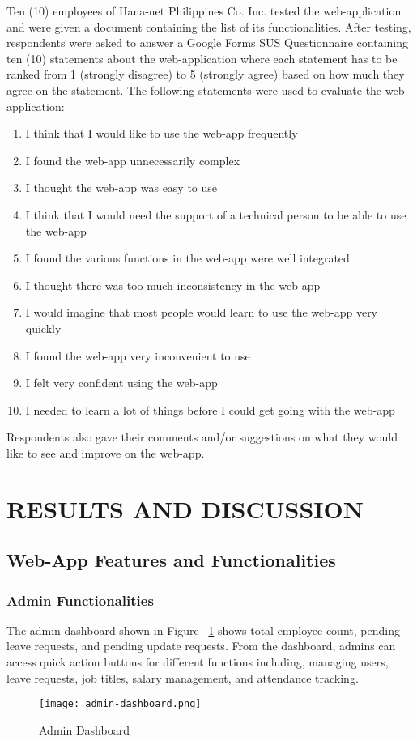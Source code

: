 \documentclass{icsthesis}
\begin{document}
\begin{mainmatter}
Ten (10) employees of Hana-net Philippines Co. Inc. tested the web-application and were given a document containing the list of its functionalities. After testing, respondents were asked to answer a Google Forms SUS Questionnaire containing ten (10) statements about the web-application where each statement has to be ranked from 1 (strongly disagree) to 5 (strongly agree) based on how much they agree on the statement. The following statements were used to evaluate the web-application:
    \begin{enumerate}
        \item I think that I would like to use the web-app frequently
        \item I found the web-app unnecessarily complex
        \item I thought the web-app was easy to use
        \item I think that I would need the support of a technical person to be able to use the web-app
        \item I found the various functions in the web-app were well integrated
        \item I thought there was too much inconsistency in the web-app
        \item I would imagine that most people would learn to use the web-app very quickly
        \item I found the web-app very inconvenient to use
        \item I felt very confident using the web-app
        \item I needed to learn a lot of things before I could get going with the web-app
    \end{enumerate}
Respondents also gave their comments and/or suggestions on what they would like to see and improve on the web-app.
		
		\section{RESULTS AND DISCUSSION}
			\subsection{\textbf{Web-App Features and Functionalities}}
\subsubsection{Admin Functionalities}
The admin dashboard shown in Figure ~\ref{fig:ad-dash} shows total employee count, pending leave requests, and pending update requests. From the dashboard, admins can access quick action buttons for different functions including, managing users, leave requests, job titles, salary management, and attendance tracking.
\begin{figure}[H]
    \centering
    \texttt{[image: admin-dashboard.png]}
    \caption{Admin Dashboard}
    \label{fig:ad-dash}
\end{figure}


\end{mainmatter}
\end{document}
